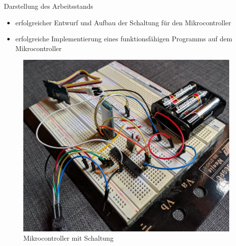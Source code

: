 \documentclass[hyphens]{beamer}
\begin{document}
 \begin{frame}{Darstellung des Arbeitsstands}
 \begin{itemize}
 \item erfolgreicher Entwurf und Aufbau der Schaltung für den Mikrocontroller
 \item erfolgreiche Implementierung eines funktionsfähigen Programms auf dem Mikrocontroller
 \end{itemize}
 \begin{figure}
 \includegraphics[scale=0.04]{img/IMG_20180624_182058}
 \caption{Mikrocontroller mit Schaltung}
 \end{figure}
 \end{frame}
\end{document}
